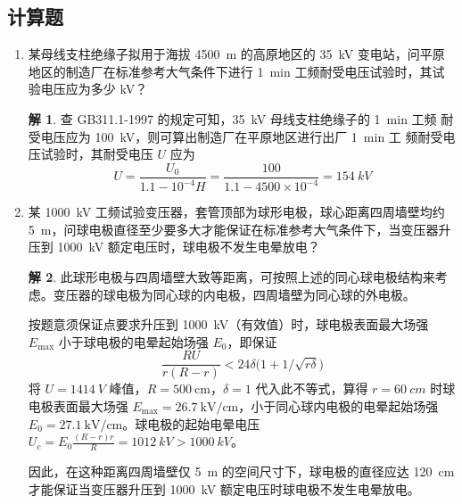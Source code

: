 \documentclass[zihao=-4,fontset = none]{ctexart}
\theoremstyle{definition}
\newtheorem*{solution}{解}
\begin{document}
\subsection{计算题}
\begin{enumerate}
  \item 某母线支柱绝缘子拟用于海拔 \SI{4500}{m} 的高原地区的 \SI{35}{kV} 变电站，问平原地区的制造厂在标准参考大气条件下进行 \SI{1}{min} 工频耐受电压试验时，其试验电压应为多少 \si{kV}？
  \begin{solution}
    查 GB311.1-1997 的规定可知，\SI{35}{kV} 母线支柱绝缘子的 \SI{1}{min} 工频
    耐受电压应为 \SI{100}{kV}，则可算出制造厂在平原地区进行出厂 \SI{1}{min} 工
    频耐受电压试验时，其耐受电压 $U$ 应为
    \[ U = \frac{U_0}{1.1-10^{-4}H} = \frac{100}{1.1-4500\times 10^{-4}} = \SI{154}{kV} \]
  \end{solution}
  \item 某 \SI{1000}{kV} 工频试验变压器，套管顶部为球形电极，球心距离四周墙壁均约 \SI{5}{m}，问球电极直径至少要多大才能保证在标准参考大气条件下，当变压器升压到 \SI{1000}{kV} 额定电压时，球电极不发生电晕放电？
  \begin{solution}
    此球形电极与四周墙壁大致等距离，可按照上述的同心球电极结构来考虑。变压器的球电极为同心球的内电极，四周墙壁为同心球的外电极。

    按题意须保证点要求升压到 \SI{1000}{\kV}（有效值）时，球电极表面最大场强 $E_{\max}$ 小于球电极的电晕起始场强 $E_0$，即保证
    \[ \frac{RU}{r(R-r)} < 24 \delta \bigl( 1 + 1/\sqrt{r\delta} \bigr) \]
    将 $U=\SI{1414}{V}$ 峰值，$R=\SI{500}{\cm}$，$\delta = 1$ 代入此不等式，算得 $r=\SI{60}{cm}$ 时球电极表面最大场强 $E_{\max} = \SI{26.7}{\kV/\cm}$，小于同心球内电极的电晕起始场强 $E_0 = \SI{27.1}{\kV/\cm}$。球电极的起始电晕电压 $U_c = E_0 \frac{(R-r)r}{R} = \SI{1012}{kV} > \SI{1000}{kV}$。

    因此，在这种距离四周墙壁仅 \SI{5}{m} 的空间尺寸下，球电极的直径应达 \SI{120}{cm} 才能保证当变压器升压到 \SI{1000}{kV} 额定电压时球电极不发生电晕放电。
  \end{solution}
\end{enumerate}
\end{document}
